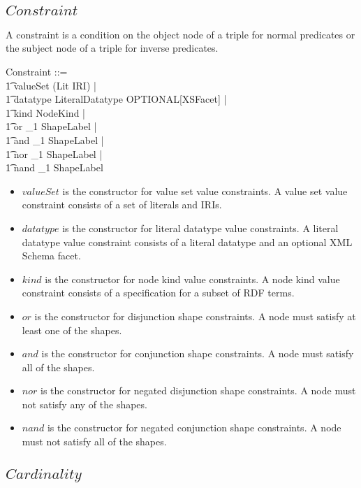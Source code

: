 \documentclass{article}
\begin{document}
\subsection{$Constraint$}
A constraint is a condition on the object node of a triple for normal predicates 
or the subject node of a triple for inverse predicates.
\begin{zed}
	Constraint ::= \\
\t1		valueSet \ldata \power (Lit \cup IRI) \rdata | \\
\t1		datatype \ldata LiteralDatatype \cross OPTIONAL[XSFacet] \rdata | \\
\t1		kind \ldata NodeKind \rdata | \\
\t1		or \ldata \seq_1 ShapeLabel \rdata | \\
\t1		and \ldata \seq_1 ShapeLabel \rdata | \\
\t1		nor \ldata \seq_1 ShapeLabel \rdata | \\
\t1		nand \ldata \seq_1 ShapeLabel \rdata
\end{zed}
\begin{itemize}
\item $valueSet$ is the constructor for value set value constraints.
A value set value constraint consists of a set of literals and IRIs.
\item $datatype$ is the constructor for literal datatype value constraints.
A literal datatype value constraint consists of a literal datatype and an optional XML Schema facet.
\item $kind$ is the constructor for node kind value constraints.
A node kind value constraint consists of a specification for a subset of RDF terms.
\item $or$ is the constructor for disjunction shape constraints.
A node must satisfy at least one of the shapes.
\item $and$ is the constructor for conjunction shape constraints.
A node must satisfy all of the shapes.
\item $nor$ is the constructor for negated disjunction shape constraints.
A node must not satisfy any of the shapes.
\item $nand$ is the constructor for negated conjunction shape constraints.
A node must not satisfy all of the shapes.
\end{itemize}

\subsection{$Cardinality$}
\end{document}
